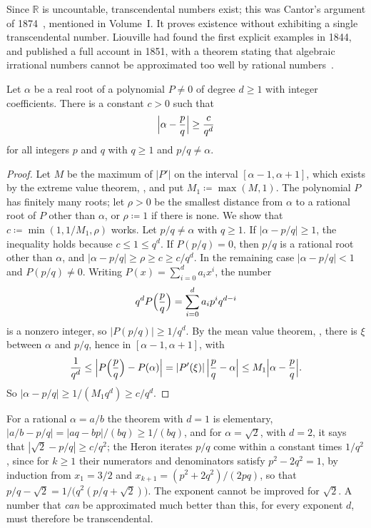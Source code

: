 Since $\mathbb R$ is uncountable, transcendental numbers exist; this was Cantor's argument of 1874~\cite{cantor1874}, mentioned in Volume~I. It proves existence without exhibiting a single transcendental number. Liouville had found the first explicit examples in 1844, and published a full account in 1851, with a theorem stating that algebraic irrational numbers cannot be approximated too well by rational numbers~\cite{liouville1851,hardywright2008}.

\begin{theorem}[Liouville]
\label{thm:liouville}
Let $\alpha$ be a real root of a polynomial $P\ne0$ of degree $d\ge1$ with integer coefficients. There is a constant $c>0$ such that
\[
\Bigl|\alpha-\frac pq\Bigr|\ge\frac c{q^d}
\]
for all integers $p$ and $q$ with $q\ge1$ and $p/q\ne\alpha$.
\end{theorem}

\begin{proof}
Let $M$ be the maximum of $|P'|$ on the interval $[\alpha-1,\alpha+1]$, which exists by the extreme value theorem, , and put $M_1\coloneqq\max(M,1)$. The polynomial $P$ has finitely many roots; let $\rho>0$ be the smallest distance from $\alpha$ to a rational root of $P$ other than $\alpha$, or $\rho\coloneqq1$ if there is none. We show that $c\coloneqq\min(1,1/M_1,\rho)$ works. Let $p/q\ne\alpha$ with $q\ge1$. If $|\alpha-p/q|\ge1$, the inequality holds because $c\le1\le q^d$. If $P(p/q)=0$, then $p/q$ is a rational root other than $\alpha$, and $|\alpha-p/q|\ge\rho\ge c\ge c/q^d$. In the remaining case $|\alpha-p/q|<1$ and $P(p/q)\ne0$. Writing $P(x)=\sum_{i=0}^da_ix^i$, the number
\[
q^dP\Bigl(\frac pq\Bigr)=\sum_{i=0}^da_ip^iq^{d-i}
\]
is a nonzero integer, so $|P(p/q)|\ge1/q^d$. By the mean value theorem, , there is $\xi$ between $\alpha$ and $p/q$, hence in $[\alpha-1,\alpha+1]$, with
\[
\frac1{q^d}\le\Bigl|P\Bigl(\frac pq\Bigr)-P(\alpha)\Bigr|=|P'(\xi)|\,\Bigl|\frac pq-\alpha\Bigr|\le M_1\Bigl|\alpha-\frac pq\Bigr| .
\]
So $|\alpha-p/q|\ge1/(M_1q^d)\ge c/q^d$.
\end{proof}

For a rational $\alpha=a/b$ the theorem with $d=1$ is elementary, $|a/b-p/q|=|aq-bp|/(bq)\ge1/(bq)$, and for $\alpha=\sqrt2$, with $d=2$, it says that $|\sqrt2-p/q|\ge c/q^2$; the Heron iterates $p/q$ come within a constant times $1/q^2$, since for $k\ge1$ their numerators and denominators satisfy $p^2-2q^2=1$, by induction from $x_1=3/2$ and $x_{k+1}=(p^2+2q^2)/(2pq)$, so that $p/q-\sqrt2=1/\bigl(q^2(p/q+\sqrt2)\bigr)$. The exponent cannot be improved for $\sqrt2$. A number that \emph{can} be approximated much better than this, for every exponent $d$, must therefore be transcendental.

